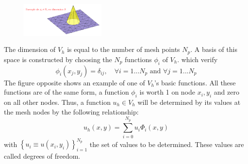 \documentclass[english,10pt,a4paper]{article}
\begin{document}
\paragraph{}
\begin{figure}
  \centering
  \includegraphics[width=0.38\textwidth]{docs/modules/ROOT/images/fonction_base_P1.png}
\end{figure}
The dimension of $V_h$ is equal to the number of mesh points $N_p$. A basis of this space is constructed by choosing the $N_p$ functions $\phi_i$ of $V_h$.
which verify
\begin{equation*}
  \phi_i(x_j,y_j) = \delta_{ij}, \quad \forall i=1...N_p \text{ and } \forall j=1...N_p
\end{equation*}
The figure opposite shows an example of one of $V_h$'s basic functions. All these functions are of the same form, a function $\phi_i$ is worth 1 on node $x_i,y_i$ and zero on all other nodes.
Thus, a function $u_h \in V_h$ will be determined by its values at the mesh nodes by the following relationship:
\begin{equation*}
  u_h(x,y) = \sum_{i=0}^{N_p} u_i \Phi_i (x,y)
\end{equation*}
with $\left\{u_i \equiv u(x_i,y_i)\right\}_{i=1}^{N_p}$ the set of values to be determined. These values are called degrees of freedom.
\end{document}
